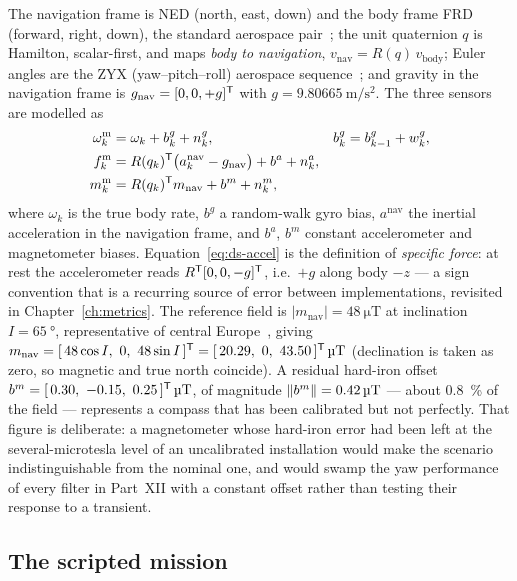 The navigation frame is NED (north, east, down) and the body frame FRD (forward, right, down), the
standard aerospace pair~\cite{groves2013,titterton2004}; the unit quaternion $q$ is Hamilton,
scalar-first, and maps \emph{body to navigation}, $v_{\text{nav}} = R(q)\,v_{\text{body}}$; Euler
angles are the ZYX (yaw--pitch--roll) aerospace sequence~\cite{kuipers1999}; and gravity in the
navigation frame is $g_{\text{nav}} = [0,0,+g]^{\mathsf{T}}$ with
$g = \SI{9.80665}{\metre\per\second\squared}$. The three sensors are modelled as
\begin{align}
\omega^{\text{m}}_k &= \omega_k + b^g_k + n^g_k, &
 b^g_k &= b^g_{k-1} + w^g_k, \label{eq:ds-gyro}\\
f^{\text{m}}_k &= R(q_k)^{\mathsf{T}}\bigl(a^{\text{nav}}_k - g_{\text{nav}}\bigr) + b^a + n^a_k, \label{eq:ds-accel}\\
m^{\text{m}}_k &= R(q_k)^{\mathsf{T}} m_{\text{nav}} + b^m + n^m_k, \label{eq:ds-mag}
\end{align}
where $\omega_k$ is the true body rate, $b^g$ a random-walk gyro bias, $a^{\text{nav}}$ the inertial
acceleration in the navigation frame, and $b^a$, $b^m$ constant accelerometer and magnetometer
biases. Equation~\eqref{eq:ds-accel} is the definition of \emph{specific force}: at rest the
accelerometer reads $R^{\mathsf{T}}[0,0,-g]^{\mathsf{T}}$, i.e.\ $+g$ along body $-z$ --- a sign convention that is a
recurring source of error between implementations, revisited in Chapter~\ref{ch:metrics}. The
reference field is $|m_{\text{nav}}| = \SI{48}{\micro\tesla}$ at inclination
$I=\SI{65}{\degree}$, representative of central Europe~\cite{chulliat2020wmm}, giving
$m_{\text{nav}} = [\,48\cos I,\ 0,\ 48\sin I\,]^{\mathsf{T}} = [\,20.29,\ 0,\ 43.50\,]^{\mathsf{T}}\,\si{\micro\tesla}$
(declination is taken as zero, so magnetic and true north coincide). A residual hard-iron offset
$b^m = [\,0.30,\ -0.15,\ 0.25\,]^\T\,\si{\micro\tesla}$, of magnitude
$\left\lVert b^m \right\rVert = \SI{0.42}{\micro\tesla}$ --- about \SI{0.8}{\percent} of the field --- represents a
compass that has been calibrated but not perfectly. That figure is deliberate: a magnetometer whose
hard-iron error had been left at the several-microtesla level of an uncalibrated installation would
make the  scenario indistinguishable from the nominal one, and would swamp
the yaw performance of every filter in Part~XII with a constant offset rather than testing their
response to a transient.

\subsection{The scripted mission}

